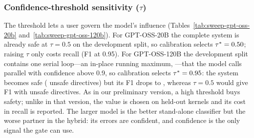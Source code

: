\subsubsection{Confidence-threshold sensitivity (\texorpdfstring{$\tau$}{tau})}
\label{sec:rq-tau}
The threshold lets a user govern the model's influence (Tables~\ref{tab:sweep-gpt-oss-20b} and~\ref{tab:sweep-gpt-oss-120b}). For GPT-OSS-20B the complete system is already safe at $\tau=0.5$ on the development split, so calibration selects $\tau^*=0.50$; raising $\tau$ only costs recall (F1 \swHCFoneNinetyFiveTwenty{} at 0.95). For GPT-OSS-120B the development split contains one serial loop---an in-place running maximum, ---that the model calls parallel with confidence above 0.9, so calibration selects $\tau^*=0.95$: the system becomes safe (\evHCOneTwentyFP{} unsafe directives) but its F1 drops to \evHCOneTwentyFone{}, whereas $\tau=0.5$ would give F1 \evHFiftyOneTwentyFone{} with \evHFiftyOneTwentyFP{} unsafe directives. As in our preliminary version, a high threshold buys safety; unlike in that version, the value is chosen on held-out kernels and its cost in recall is reported. The larger model is the better stand-alone classifier but the worse partner in the hybrid: its errors are confident, and confidence is the only signal the gate can use.




